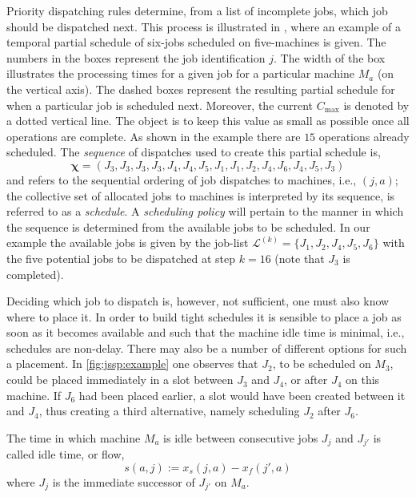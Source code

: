\documentclass[smallextended]{svjour3}
\renewcommand{\vchi}{\bm \chi}
\begin{document}
Priority dispatching rules determine, from a list of incomplete jobs, which job should be dispatched next. This process is illustrated in , where an example of 
a temporal partial schedule of six-jobs scheduled on five-machines is given. 
The numbers in the boxes represent the job identification $j$. 
The width of the box illustrates the processing times for a given job for a 
particular machine $M_a$ (on the vertical axis). 
The dashed boxes represent the resulting partial schedule for when a particular 
job is scheduled next. 
Moreover, the current $C_{\max}$ is denoted by a dotted vertical line. 
The object is to keep this value as small as possible once all operations are 
complete. As shown in the example there are $15$ operations already scheduled. 
The \textit{sequence} of dispatches used to create this partial schedule is,
\begin{equation}
	\vchi=\left(J_3,J_3,J_3,J_3,J_4,J_4,J_5,J_1,J_1,J_2,J_4,J_6,J_4,J_5,J_3\right)
\end{equation}
and refers to the sequential ordering of job dispatches to machines, i.e., $(j,a)$; 
the collective set of allocated jobs to machines is interpreted by its 
sequence, is referred to as a \emph{schedule}.
A \emph{scheduling policy} will pertain to the manner in which 
the sequence is determined from the available jobs to be scheduled. 
In our example the available jobs is given by the job-list
$\mathcal{L}^{(k)}=\{J_1,J_2,J_4,J_5,J_6\}$ with the five potential jobs 
to be dispatched at step $k=16$ (note that $J_3$ is completed).

Deciding which job to dispatch is, however, not sufficient, one must also know 
where to place it. In order to build tight schedules it is sensible to place a 
job as soon as it becomes available and such that the machine idle time is 
minimal, i.e., schedules are non-delay. 
There may also be a number of different options for such a placement. 
In \cref{fig:jssp:example} one observes that $J_2$, to be scheduled on $M_3$, 
could be placed immediately in a slot between $J_3$ and $J_4$, or after $J_4$ 
on this machine. 
If $J_6$ had been placed earlier, a slot would have been created between it and 
$J_4$, thus creating a third alternative, namely scheduling $J_2$ after $J_6$. 

The time in which machine $M_a$ is idle between consecutive jobs $J_j$ and 
$J_{j'}$ is called idle time, or flow, \begin{equation} 
s(a,j):=x_s(j,a)-x_f(j',a) \label{eq:slack}\end{equation}
where $J_j$ is the immediate successor of $J_{j'}$ on $M_a$. 
\end{document}
